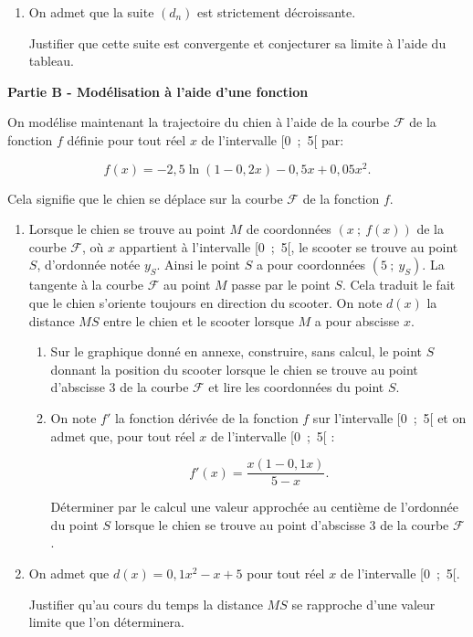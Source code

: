 \documentclass{cornouaille}
\begin{document}
\begin{exercice}
\begin{enumerate}
\begin{enumerate}
\medskip

		\item On admet que la suite $\left(d_n\right)$ est strictement décroissante.

Justifier que cette suite est convergente et conjecturer sa limite à l'aide du tableau.
 	\end{enumerate}
\end{enumerate}
 
\bigskip
 
\textbf{Partie B - Modélisation à l'aide d'une fonction}
 
 \medskip
 
On modélise maintenant la trajectoire du chien à l'aide de la courbe $\mathcal{F}$ de la fonction $f$ définie
pour tout réel $x$ de l'intervalle [0~;~5[ par:
 
\[f(x) = -2,5\ln (1 - 0, 2x) - 0,5x + 0,05x^2.\]
 
 \medskip
 
Cela signifie que le chien se déplace sur la courbe $\mathcal{F}$ de la fonction $f$.
 
 \medskip
 
\begin{enumerate}
\item Lorsque le chien se trouve au point $M$ de coordonnées $(x~;~f(x))$ de la courbe $\mathcal{F}$, où $x$  appartient à l'intervalle [0~;~5[, le scooter se trouve au point $S$, d'ordonnée notée $y_S$. Ainsi le point $S$
a pour coordonnées $\left(5~;~y_S\right)$. La tangente à la courbe $\mathcal{F}$ au point $M$ passe par le point $S$. Cela traduit le fait que le chien s'oriente toujours en direction du scooter. On note $d(x)$ la distance $MS$ entre le chien et le scooter lorsque $M$ a pour abscisse $x$.
	\begin{enumerate}
		\item Sur le graphique  donné en annexe, construire, sans calcul, le point $S$ donnant la position du scooter lorsque le chien se trouve au point d'abscisse 3 de la courbe $\mathcal{F}$ et lire les
coordonnées du point $S$.
		\item On note $f'$ la fonction dérivée de la fonction $f$ sur l'intervalle [0~;~5[ et on admet que, pour tout réel $x$ de l'intervalle [0~;~5[ :

\[f'(x) = \dfrac{x(1  - 0,1x)}{5 - x}.\]

Déterminer par le calcul une valeur approchée au centième de l'ordonnée du point $S$ lorsque
le chien se trouve au point d'abscisse 3 de la courbe $\mathcal{F}$.
	\end{enumerate}
\item  On admet que $d(x) = 0,1x^2 - x + 5$ pour tout réel $x$ de l'intervalle [0~;~5[.

Justifier qu'au cours du temps la distance $MS$ se rapproche d'une valeur limite que l'on déterminera.
\end{enumerate}
\end{exercice}
\end{document}
